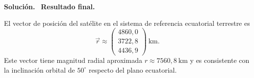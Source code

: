 \documentclass[11pt]{article}
\theoremstyle{prismstyle}
\newenvironment{solution}[1][Solución]
  {\par\textbf{#1.}\ }
  {\par}
\begin{document}
\begin{solution}
\textbf{Resultado final.}

El vector de posición del satélite en el sistema de referencia ecuatorial terrestre es
\[
\boxed{\vec{r} \approx
\begin{pmatrix}
4860{,}0 \\
3722{,}8 \\
4436{,}9
\end{pmatrix}\ \text{km}}.
\]
Este vector tiene magnitud radial aproximada $r\approx 7560{,}8\ \text{km}$ y es consistente con la inclinación orbital de $50^\circ$ respecto del plano ecuatorial.
\end{solution}
\end{document}
